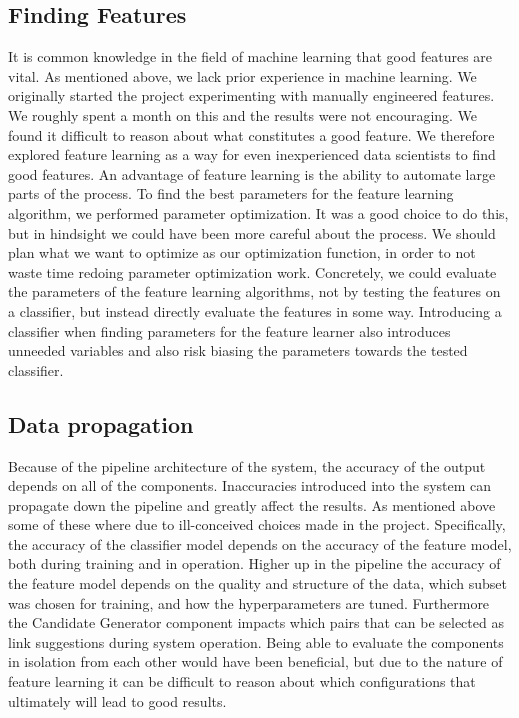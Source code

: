 \subsection{Finding Features}
It is common knowledge in the field of machine learning that good features are vital. As mentioned above, we lack prior experience in machine learning. We originally started the project experimenting with manually engineered features. We roughly spent a month on this and the results were not encouraging. We found it difficult to reason about what constitutes a good feature. We therefore explored feature learning as a way for even inexperienced data scientists to find good features. An advantage of feature learning is the ability to automate large parts of the process. To find the best parameters for the feature learning algorithm, we performed parameter optimization. It was a good choice to do this, but in hindsight we could have been more careful about the process. We should plan what we want to optimize as our optimization function, in order to not waste time redoing parameter optimization work. Concretely, we could evaluate the parameters of the feature learning algorithms, not by testing the features on a classifier, but instead directly evaluate the features in some way. Introducing a classifier when finding parameters for the feature learner also introduces unneeded variables and also risk biasing the parameters towards the tested classifier.

\subsection{Data propagation}
Because of the pipeline architecture of the system, the accuracy of the output depends on all of the components.
Inaccuracies introduced into the system can propagate down the pipeline and greatly affect the results. As mentioned above some of these where due to ill-conceived choices made in the project.
Specifically, the accuracy of the classifier model depends on the accuracy of the feature model, both during training and in operation. Higher up in the pipeline the accuracy of the feature model depends on the quality and structure of the data, which subset was chosen for training, and how the hyperparameters are tuned. Furthermore the Candidate Generator component impacts which pairs that can be selected as link suggestions during system operation.
Being able to evaluate the components in isolation from each other would have been beneficial, but due to the nature of feature learning it can be difficult to reason about which configurations that ultimately will lead to good results.

